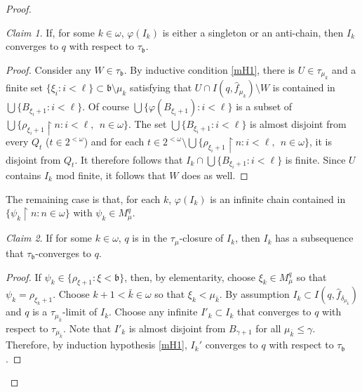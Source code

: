 \documentclass{amsart}
\theoremstyle{definition}
\theoremstyle{remark}
\newtheorem{claim}{Claim}
\begin{document}
\begin{proof}
 \begin{claim} If, for some $k\in\omega$, $\varphi(I_k)$ is either a singleton
  or an anti-chain, then $I_k$ converges to $q$ with respect to $\tau_{\mathfrak b}$. 
 \end{claim}


 \begin{proof}  
 Consider any $W\in \tau_{\mathfrak b}$.  By inductive condition \ref{mH1},
  there is   $U\in \tau_{\mu_k}$ and a finite set $\{\xi_i : i<\ell\}\subset
     \mathfrak b \setminus \mu_k$ satisfying that
       $U\cap I(q,\hat f_{\mu_k}) \setminus W$ is contained in
         $\bigcup\{ B_{\xi_i+1} : i< \ell\}$.  
Of course $\bigcup\{ \varphi(B_{\xi_i+1}) : i<\ell\}$ is a subset of
   $\bigcup \{ \rho_{\xi_i+1}\restriction n : i< \ell,\ \ n\in\omega\}$. 
The set $\bigcup\{ B_{\xi_i+1} : i< \ell\}$ is almost disjoint
from every $Q_t$ ($t\in 2^{<\omega}$) and for each
 $t\in 2^{<\omega}\setminus 
  \bigcup \{ \rho_{\xi_i+1}\restriction n : i< \ell,\ \ n\in\omega\}$,
  it 
      is disjoint from
      $Q_t$.   
      It therefore follows that $I_k\cap 
        \bigcup\{ B_{\xi_i+1} : i< \ell\} $ is finite. 
        Since $U$ contains $I_k$ mod finite, it follows
        that $W$ does as well.
 \end{proof}

 The remaining case is that, for each $k$, $\varphi(I_k)$
 is an infinite chain contained in $\{ \psi_k\restriction n : n\in \omega\}$
 with $\psi_k\in M^q_\mu$.  
 
 \begin{claim} If for some $k\in\omega$, $q$  is in the $\tau_{\mu}$-closure
 of $I_k$, then $I_k$ has a subsequence that $\tau_{\mathfrak b}$-converges to $q$.
 \end{claim}

 \begin{proof}  If $\psi_k\in \{ \rho_{\xi+1} : \xi <\mathfrak b\}$, then,
  by elementarity, 
 choose $\xi_k\in M^q_\mu$ so that $\psi_k = \rho_{\xi_k+1}$.  Choose 
  $ k +1 < \bar k\in \omega$ so that $\xi_k < \mu_{\bar k}$. 
  By assumption $I_k \subset I(q, \hat f_{\delta_{\mu_{\bar k}}})$ and
     $q$ is a $\tau_{\mu_{\bar k}}$-limit of $I_k$. Choose any infinite
      $I'_k\subset I_k$ that converges to $q$ with respect to 
      $\tau_{\mu_{\bar k}}$. Note that $I'_k$ is almost disjoint
      from $B_{\gamma+1}$ for all $\mu_{\bar k}\leq \gamma$. 
      Therefore, by induction hypothesis \ref{mH1}, $I_k'$ 
      converges to $q$ with respect to $\tau_{\mathfrak b}$. 
 \end{proof}



\end{proof}
\end{document}
